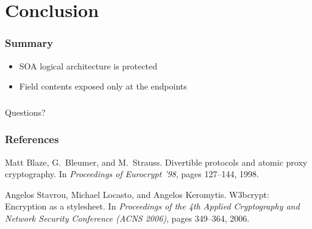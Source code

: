 \documentclass{beamer}
\begin{document}
\section{Conclusion}
\begin{frame}
\frametitle{Summary}
\begin{itemize}
\item SOA logical architecture is protected
\item Field contents exposed only at the endpoints
\end{itemize}
\end{frame}

\begin{frame}
\frametitle{}
\begin{center}
\Large{Questions?}
\end{center}
\end{frame}


\begin{frame}
\frametitle{References}
\begin{thebibliography}{10}

Matt Blaze, G.~Bleumer, and M.~Strauss.
\newblock Divertible protocols and atomic proxy cryptography.
\newblock In {\em Proceedings of Eurocrypt '98}, pages 127--144, 1998.

Angelos Stavrou, Michael Locasto, and Angelos Keromytis.
\newblock W3bcrypt: Encryption as a stylesheet.
\newblock In {\em Proceedings of the 4th Applied Cryptography and Network
  Security Conference (ACNS 2006)}, pages 349--364, 2006.
\end{thebibliography}
\end{frame}
\end{document}
